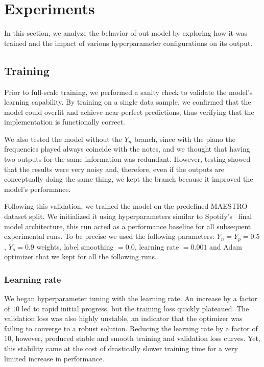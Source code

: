\documentclass[10pt,twocolumn,letterpaper]{article}
\begin{document}
\section{Experiments}\label{sec:experiments}

In this section, we analyze the behavior of out model by exploring how it was trained and the impact of various hyperparameter configurations on its output.

\subsection{Training}

Prior to full-scale training, we performed a sanity check to validate the model's learning capability. By training on a single data sample, we confirmed that the model could overfit and achieve near-perfect predictions, thus verifying that the implementation is functionally correct.

We also tested the model without the $Y_n$ branch, since with the piano the frequencies played always coincide with the notes, and we thought that having two outputs for the same information was redundant. However, testing showed that the results were very noisy and, therefore, even if the outputs are conceptually doing the same thing, we kept the branch because it improved the model’s performance.

Following this validation, we trained the model on the predefined MAESTRO~\cite{maestro} dataset split. We initialized it using hyperparameters similar to Spotify's~\cite{spoty-audio} final model architecture, this run acted as a performance baseline for all subsequent experimental runs. To be precise we used the following parameters: $Y_n = Y_p = \num{0.5}$, $Y_o = \num{0.9}$ weights, label smoothing $= \num{0.0}$, learning rate $=\num{0.001}$ and Adam optimizer that we kept for all the following runs.

\subsubsection{Learning rate}

We began hyperparameter tuning with the learning rate. An increase by a factor of $\num{10}$ led to rapid initial progress, but the training loss quickly plateaued. The validation loss was also highly unstable, an indicator that the optimizer was failing to converge to a robust solution. Reducing the learning rate by a factor of $\num{10}$, however, produced stable and smooth training and validation loss curves. Yet, this stability came at the cost of drastically slower training time for a very limited increase in performance.
\end{document}
